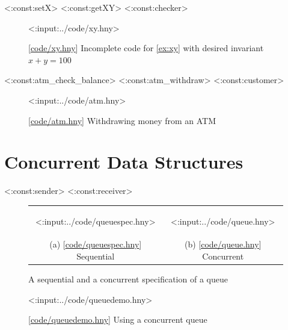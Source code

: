 \documentclass{report}
\newcommand{\harmonylink}[1]{%
[\href{https://harmony.cs.cornell.edu/#1}{\underline{#1}}]%
}
\newenvironment{code}{
\tcolorbox
}{
\endtcolorbox
}
\begin{document}
<{:const:setX}>
<{:const:getXY}>
<{:const:checker}>

\begin{figure}
\begin{code}
<{:input:../code/xy.hny}>
\end{code}
\caption{\harmonylink{code/xy.hny} Incomplete code for \autoref{ex:xy} with desired invariant $x + y = 100$}
\label{fig:xy}
\end{figure}

<{:const:atm_check_balance}>
<{:const:atm_withdraw}>
<{:const:customer}>

\begin{figure}
\begin{code}
<{:input:../code/atm.hny}>
\end{code}
\caption{\harmonylink{code/atm.hny} Withdrawing money from an ATM}
\label{fig:atm}
\end{figure}

\chapter{Concurrent Data Structures}
\label{ch:cds}

<{:const:sender}>
<{:const:receiver}>

\begin{figure}[h]
\begin{center}
\begin{tabular}{cc}
\begin{tcolorbox}[width=0.42\linewidth]
<{:input:../code/queuespec.hny}>
\end{tcolorbox}
&
\begin{tcolorbox}[width=0.53\linewidth]
<{:input:../code/queue.hny}>
\end{tcolorbox}
\\
(a) \harmonylink{code/queuespec.hny} Sequential & (b) \harmonylink{code/queue.hny} Concurrent
\end{tabular}
\end{center}
\caption{A sequential and a concurrent specification of a queue}
\label{fig:queues}
\end{figure}

\begin{figure}
\begin{code}
<{:input:../code/queuedemo.hny}>
\end{code}
\caption{\harmonylink{code/queuedemo.hny} Using a concurrent queue}
\label{fig:queuedemo}
\end{figure}
\end{document}
